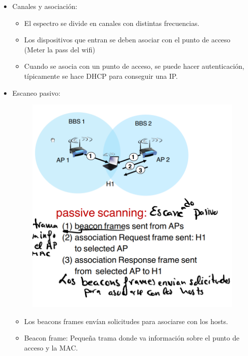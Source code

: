 \documentclass[12pt, twoside, openright]{report} %
\begin{document}
\begin{itemize}
\begin{itemize}
  \item Canales y asociación:
  \begin{itemize}
    \item El espectro se divide en canales con distintas frecuencias.
    \item Los dispositivos que entran se deben asociar con el punto de acceso (Meter la pass del wifi)
    \item Cuando se asocia con un punto de acceso, se puede hacer autenticación, típicamente se hace DHCP para conseguir una IP.
  \end{itemize}
\item Escaneo pasivo:
\begin{figure}[H]
  {\includegraphics[scale=.25]{Untitled 61.png}}
\end{figure}
  \begin{itemize}
    \item Los beacons frames envían solicitudes para asociarse con los hosts.
    \item Beacon frame: Pequeña trama donde va información sobre el punto de acceso y la MAC.
  \end{itemize}


\end{itemize}
\end{itemize}
\end{document}
